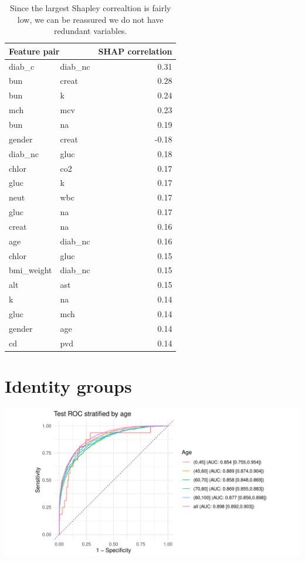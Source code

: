 \documentclass[12pt]{article}
\begin{document}
\clearpage
\begin{table}[h]
\centering
\begin{tabular}{llr}
\toprule
\multicolumn{2}{l}{Feature pair} & SHAP correlation \\
\midrule
diab\_c & diab\_nc & 0.31 \\ 
bun & creat & 0.28 \\ 
bun & k & 0.24 \\ 
mch & mcv & 0.23 \\ 
bun & na & 0.19 \\ \addlinespace
gender & creat & -0.18 \\ 
diab\_nc & gluc & 0.18 \\ 
chlor & co2 & 0.17 \\ 
gluc & k & 0.17 \\ 
neut & wbc & 0.17 \\ \addlinespace
gluc & na & 0.17 \\ 
creat & na & 0.16 \\ 
age & diab\_nc & 0.16 \\ 
chlor & gluc & 0.15 \\ 
bmi\_weight & diab\_nc & 0.15 \\ \addlinespace
alt & ast & 0.15 \\ 
k & na & 0.14 \\ 
gluc & mch & 0.14 \\ 
gender & age & 0.14 \\ 
cd & pvd & 0.14 \\  
\bottomrule
\end{tabular}
\caption{Since the largest Shapley correaltion is fairly low, we can be reassured we do not have redundant variables.}
\end{table}


\clearpage
\section*{Identity groups}

\begin{center}
\includegraphics[width=\textwidth]{figures/roc_age.pdf}
\end{center}
\end{document}
